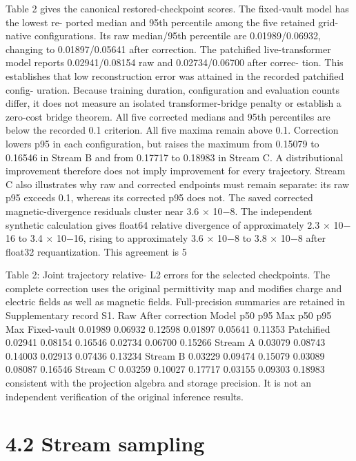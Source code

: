 \documentclass[11pt]{article}
\begin{document}
Table 2 gives the canonical restored-checkpoint scores. The fixed-vault model has the lowest re-
ported median and 95th percentile among the five retained grid-native configurations. Its raw
median/95th percentile are 0.01989/0.06932, changing to 0.01897/0.05641 after correction. The
patchified live-transformer model reports 0.02941/0.08154 raw and 0.02734/0.06700 after correc-
tion. This establishes that low reconstruction error was attained in the recorded patchified config-
uration. Because training duration, configuration and evaluation counts differ, it does not measure
an isolated transformer-bridge penalty or establish a zero-cost bridge theorem.
All five corrected medians and 95th percentiles are below the recorded 0.1 criterion. All five
maxima remain above 0.1. Correction lowers p95 in each configuration, but raises the maximum
from 0.15079 to 0.16546 in Stream B and from 0.17717 to 0.18983 in Stream C. A distributional
improvement therefore does not imply improvement for every trajectory. Stream C also illustrates
why raw and corrected endpoints must remain separate: its raw p95 exceeds 0.1, whereas its
corrected p95 does not.
The saved corrected magnetic-divergence residuals cluster near 3.6 \ensuremath{\times} 10\ensuremath{-}8. The independent
synthetic calculation gives float64 relative divergence of approximately 2.3 \ensuremath{\times} 10\ensuremath{-}16 to 3.4 \ensuremath{\times} 10\ensuremath{-}16,
rising to approximately 3.6 \ensuremath{\times} 10\ensuremath{-}8 to 3.8 \ensuremath{\times} 10\ensuremath{-}8 after float32 requantization. This agreement is
5

Table 2: Joint trajectory relative- L2 errors for the selected checkpoints. The complete correction
uses the original permittivity map and modifies charge and electric fields as well as magnetic fields.
Full-precision summaries are retained in Supplementary record S1.
Raw After correction
Model p50 p95 Max p50 p95 Max
Fixed-vault 0.01989 0.06932 0.12598 0.01897 0.05641 0.11353
Patchified 0.02941 0.08154 0.16546 0.02734 0.06700 0.15266
Stream A 0.03079 0.08743 0.14003 0.02913 0.07436 0.13234
Stream B 0.03229 0.09474 0.15079 0.03089 0.08087 0.16546
Stream C 0.03259 0.10027 0.17717 0.03155 0.09303 0.18983
consistent with the projection algebra and storage precision. It is not an independent verification
of the original inference results.

\section*{4.2 Stream sampling}
\end{document}
